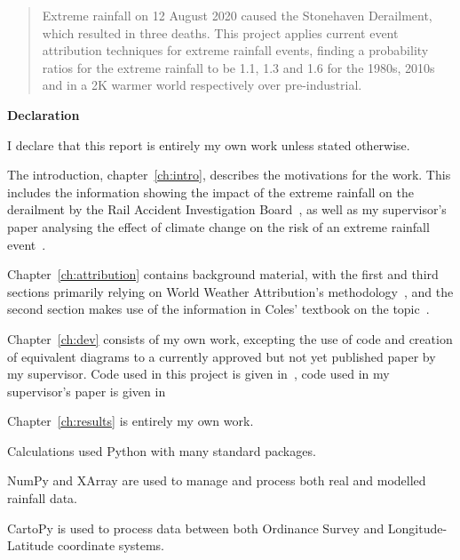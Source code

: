 \documentclass[12pt,a4paper]{report}
\begin{document}
\newpage



\begin{abstract}

Extreme rainfall on 12 August 2020 caused the Stonehaven Derailment,
    which resulted in three deaths.
This project applies current event attribution techniques for extreme rainfall events,
    finding a probability ratios for the extreme rainfall to be 1.1, 1.3 and 1.6 for the 1980s, 2010s and in a 2K warmer world
    respectively over pre-industrial.

\end{abstract}


\begin{center}
\textbf{Declaration}
\end{center}

I declare that this report is entirely my own work unless stated otherwise.

The introduction, chapter~\ref{ch:intro}, describes the motivations for the work.
This includes the information showing the impact of the extreme rainfall on the derailment by the Rail Accident Investigation Board~\cite{RAIB_2022},
    as well as my supervisor's paper analysing the effect of climate change on the risk of an extreme rainfall event~\cite{Tett_Soon}.

Chapter~\ref{ch:attribution} contains background material,
    with the first and third sections primarily relying on World Weather Attribution's methodology~\cite{van_Oldenborgh_et_al_2021},
    and the second section makes use of the information in Coles' textbook on the topic~\cite{Coles_2001}.

Chapter~\ref{ch:dev} consists of my own work,
    excepting the use of code and creation of equivalent diagrams to a currently approved but not yet published paper by my supervisor.
Code used in this project is given in~\cite{Me_Code},
    code used in my supervisor's paper is given in~\cite{Tett_Code}

Chapter~\ref{ch:results} is entirely my own work.

\bigskip

Calculations used Python with many standard packages.

NumPy and XArray are used to manage and process both real and modelled rainfall data.

CartoPy is used to process data between both Ordinance Survey and Longitude-Latitude coordinate systems.
\end{document}
